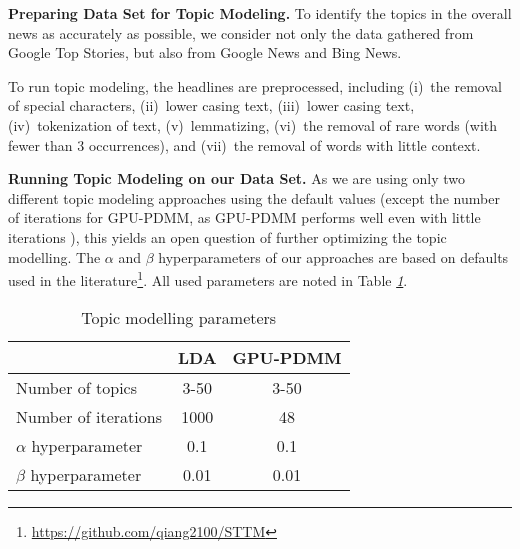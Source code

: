 \textbf{Preparing Data Set for Topic Modeling.}
To identify the topics in the overall news as accurately as possible, we 
consider 
not only the data gathered from Google Top Stories, but also from Google News and Bing News. 

To run topic modeling, the headlines 
are preprocessed, including (i)~the removal of special characters, (ii)~lower casing text, (iii)~lower casing text, (iv)~tokenization of text, (v)~lemmatizing, (vi)~the removal of rare words (with fewer than 3 occurrences), and (vii)~the removal of words with little context.


\textbf{Running Topic Modeling on our Data Set. }
\label{subsec:running_topicmodelling}
%
As we are using only two different topic modeling approaches using the default values (except the number of iterations for GPU-PDMM, as GPU-PDMM performs well even with little iterations \citep{qiang_short_2020}), this yields an open question of further optimizing the topic modelling. 
The $\alpha$ and $\beta$ hyperparameters of our approaches are based on defaults used in the literature\footnote{\url{https://github.com/qiang2100/STTM}}. All used parameters are noted in Table \textit{\ref{table:topic_modelling_parameters}}.

%
\begin{table}[tb]
\centering
\begin{tabular}{lcc}
\toprule 
    & \textbf{LDA }
    & \textbf{GPU-PDMM}
\\ 
\midrule
    Number of topics    
    & 3-50
    & 3-50
\\
    Number of iterations    
    & 1000
    & 48
\\
    $\alpha$ hyperparameter     
    & 0.1
    & 0.1
\\
    $\beta$ hyperparameter
    & 0.01
    & 0.01
\\
\bottomrule
\end{tabular}
\caption{Topic modelling parameters}
\label{table:topic_modelling_parameters}
\end{table}

